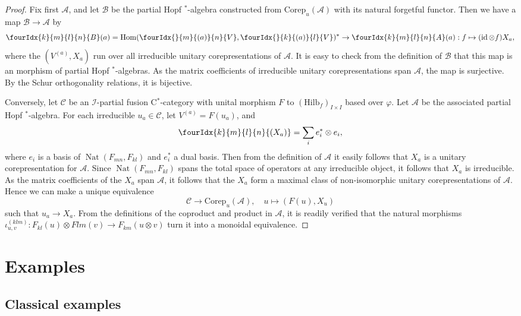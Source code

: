 \documentclass[10pt]{article}
\DeclareMathOperator{\id}{id}
\DeclareMathOperator{\Hom}{Hom}
\DeclareMathOperator{\Nat}{\mathrm{Nat}}
\newcommand{\Corep}{\mathrm{Corep}}
\newcommand{\CatCC}{\mathscr{C}}
\newcommand{\Hilb}{\mathrm{Hilb}}
\newcommand{\Gr}[5]{\fourIdx{#2}{#4}{#3}{#5}{#1}}%
\theoremstyle{definition}
\numberwithin{equation}{section}
\begin{document}
\begin{proof} Fix first $\mathscr{A}$, and let $\mathscr{B}$ be the partial Hopf $^*$-algebra constructed from $\Corep_u(\mathscr{A})$ with its natural forgetful functor. Then we have a map $\mathscr{B} \rightarrow \mathscr{A}$ by \[ \Gr{B}{k}{l}{m}{n}(a) = \Hom(\Gr{V}{}{(a)}{m}{n},\Gr{V}{}{(a)}{k}{l})^* \rightarrow \Gr{A}{k}{l}{m}{n}(a):  f \mapsto (\id\otimes f)X_a,\] where the $(V^{(a)},X_a)$ run over all irreducible unitary corepresentations of $\mathscr{A}$. It is easy to check from the definition of $\mathscr{B}$ that this map is an morphism of partial Hopf $^*$-algebras. As the matrix coefficients of irreducible unitary corepresentations span $\mathscr{A}$, the map is surjective. By the Schur orthogonality relations, it is bijective.

Conversely, let $\CatCC$ be an $\mathscr{I}$-partial fusion C$^*$-category with unital morphism $F$ to $(\Hilb_f)_{I\times I}$ based over $\varphi$. Let $\mathscr{A}$ be the associated partial Hopf $^*$-algebra. For each irreducible $u_a \in \CatCC$, let $V^{(a)} = F(u_a)$, and \[\Gr{(X_a)}{k}{l}{m}{n} = \sum_i e_i^*\otimes e_i,\] where $e_i$ is a basis of $\Nat(F_{mn},F_{kl})$ and $e_i^*$ a dual basis. Then from the definition of $\mathscr{A}$ it easily follows that $X_a$ is a unitary corepresentation for $\mathscr{A}$. Since $\Nat(F_{mn},F_{kl})$ spans the total space of operators at any irreducible object, it follows that $X_a$ is irreducible. As the matrix coefficients of the $X_a$ span $\mathscr{A}$, it follows that the $X_a$ form a maximal class of non-isomorphic unitary corepresentations of $\mathscr{A}$. Hence we can make a unique equivalence \[\CatCC\rightarrow \Corep_u(\mathscr{A}), \quad u \mapsto (F(u),X_u)\] such that $u_a\rightarrow X_a$. From the definitions of the coproduct and product in $\mathscr{A}$, it is readily verified that the natural morphisms $\iota^{(klm)}_{u,v}:F_{kl}(u)\otimes F{lm}(v)\rightarrow F_{km}(u\otimes v)$ turn it into a monoidal equivalence. 
\end{proof}


\section{Examples}

\subsection{Classical examples}
\end{document}
